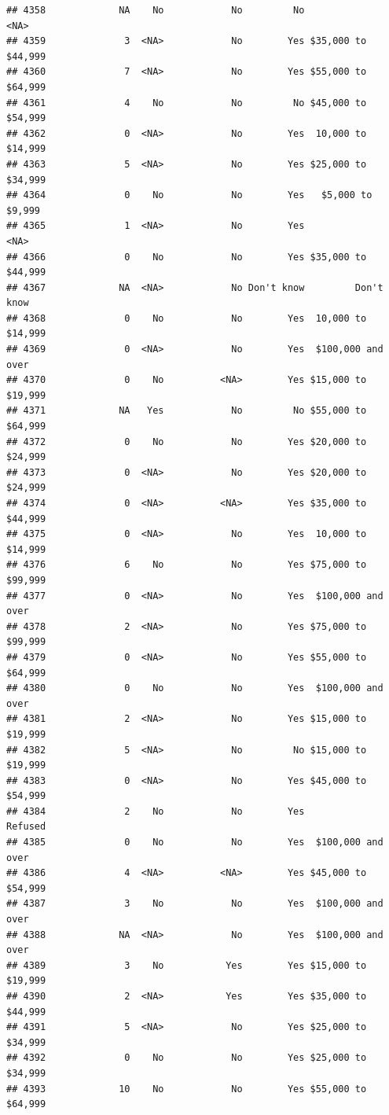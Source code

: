 \documentclass[man]{apa6}
\begin{document}
\begin{verbatim}
## 4358             NA    No            No         No               <NA>
## 4359              3  <NA>            No        Yes $35,000 to $44,999
## 4360              7  <NA>            No        Yes $55,000 to $64,999
## 4361              4    No            No         No $45,000 to $54,999
## 4362              0  <NA>            No        Yes  10,000 to $14,999
## 4363              5  <NA>            No        Yes $25,000 to $34,999
## 4364              0    No            No        Yes   $5,000 to $9,999
## 4365              1  <NA>            No        Yes               <NA>
## 4366              0    No            No        Yes $35,000 to $44,999
## 4367             NA  <NA>            No Don't know         Don't know
## 4368              0    No            No        Yes  10,000 to $14,999
## 4369              0  <NA>            No        Yes  $100,000 and over
## 4370              0    No          <NA>        Yes $15,000 to $19,999
## 4371             NA   Yes            No         No $55,000 to $64,999
## 4372              0    No            No        Yes $20,000 to $24,999
## 4373              0  <NA>            No        Yes $20,000 to $24,999
## 4374              0  <NA>          <NA>        Yes $35,000 to $44,999
## 4375              0  <NA>            No        Yes  10,000 to $14,999
## 4376              6    No            No        Yes $75,000 to $99,999
## 4377              0  <NA>            No        Yes  $100,000 and over
## 4378              2  <NA>            No        Yes $75,000 to $99,999
## 4379              0  <NA>            No        Yes $55,000 to $64,999
## 4380              0    No            No        Yes  $100,000 and over
## 4381              2  <NA>            No        Yes $15,000 to $19,999
## 4382              5  <NA>            No         No $15,000 to $19,999
## 4383              0  <NA>            No        Yes $45,000 to $54,999
## 4384              2    No            No        Yes            Refused
## 4385              0    No            No        Yes  $100,000 and over
## 4386              4  <NA>          <NA>        Yes $45,000 to $54,999
## 4387              3    No            No        Yes  $100,000 and over
## 4388             NA  <NA>            No        Yes  $100,000 and over
## 4389              3    No           Yes        Yes $15,000 to $19,999
## 4390              2  <NA>           Yes        Yes $35,000 to $44,999
## 4391              5  <NA>            No        Yes $25,000 to $34,999
## 4392              0    No            No        Yes $25,000 to $34,999
## 4393             10    No            No        Yes $55,000 to $64,999

\end{verbatim}
\end{document}
